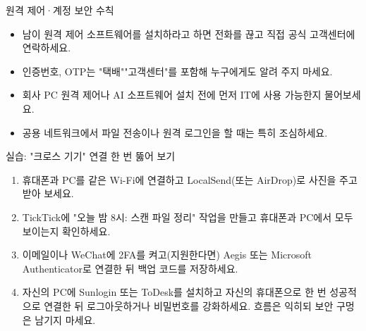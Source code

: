 \begin{tcbwarn}{원격 제어·계정 보안 수칙}
\begin{itemize}
  \item 남이 원격 제어 소프트웨어를 설치하라고 하면 전화를 끊고 직접 공식 고객센터에 연락하세요.
  \item 인증번호, OTP는 "택배""고객센터"를 포함해 누구에게도 알려 주지 마세요.
  \item 회사 PC 원격 제어나 AI 소프트웨어 설치 전에 먼저 IT에 사용 가능한지 물어보세요.
  \item 공용 네트워크에서 파일 전송이나 원격 로그인을 할 때는 특히 조심하세요.
\end{itemize}

\end{tcbwarn}

\begin{tcbpractice}{실습: "크로스 기기" 연결 한 번 뚫어 보기}
\begin{enumerate}
  \item 휴대폰과 PC를 같은 Wi-Fi에 연결하고 LocalSend(또는 AirDrop)로 사진을 주고받아 보세요.
  \item TickTick에 "오늘 밤 8시: 스캔 파일 정리" 작업을 만들고 휴대폰과 PC에서 모두 보이는지 확인하세요.
  \item 이메일이나 WeChat에 2FA를 켜고(지원한다면) Aegis 또는 Microsoft Authenticator로 연결한 뒤 백업 코드를 저장하세요.
  \item 자신의 PC에 Sunlogin 또는 ToDesk를 설치하고 자신의 휴대폰으로 한 번 성공적으로 연결한 뒤 로그아웃하거나 비밀번호를 강화하세요. 흐름은 익히되 보안 구멍은 남기지 마세요.
\end{enumerate}

\end{tcbpractice}
